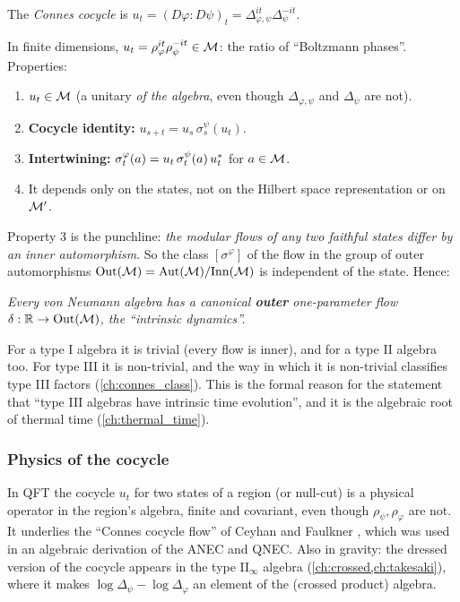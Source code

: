 \begin{definition}
The \emph{Connes cocycle} is $u_t=(D\varphi:D\psi)_t=\Delta_{\varphi,\psi}^{it}\Delta_\psi^{-it}$.
\end{definition}
In finite dimensions, $u_t=\rho_\varphi^{it}\rho_\psi^{-it}\in\mathcal{M}$: the ratio of ``Boltzmann phases''. Properties:
\begin{enumerate}
\item $u_t\in\mathcal{M}$ (a unitary \emph{of the algebra}, even though $\Delta_{\varphi,\psi}$ and $\Delta_\psi$ are not).
\item \textbf{Cocycle identity:} $u_{s+t}=u_s\,\sigma^\psi_s(u_t)$.
\item \textbf{Intertwining:} $\sigma^\varphi_t(a)=u_t\,\sigma^\psi_t(a)\,u_t^{*}$ for $a\in\mathcal{M}$.
\item It depends only on the states, not on the Hilbert space representation or on $\mathcal{M}'$.
\end{enumerate}
Property 3 is the punchline: \emph{the modular flows of any two faithful states differ by an inner automorphism}. So the class $[\sigma^\varphi]$ of the flow in the group of outer automorphisms $\mathrm{Out}(\mathcal{M})=\operatorname{Aut}(\mathcal{M})/\mathrm{Inn}(\mathcal{M})$ is independent of the state. Hence:

\begin{center}
\emph{Every von Neumann algebra has a canonical \textbf{outer} one-parameter flow $\delta:\mathbb{R}\to\mathrm{Out}(\mathcal{M})$, the ``intrinsic dynamics''.}
\end{center}
For a type I algebra it is trivial (every flow is inner), and for a type II algebra too. For type III it is non-trivial, and the way in which it is non-trivial classifies type III factors (\cref{ch:connes_class}). This is the formal reason for the statement that ``type III algebras have intrinsic time evolution'', and it is the algebraic root of thermal time (\cref{ch:thermal_time}).

\subsubsection*{Physics of the cocycle}
In QFT the cocycle $u_t$ for two states of a region (or null-cut) is a physical operator in the region's algebra, finite and covariant, even though $\rho_\psi,\rho_\varphi$ are not. It underlies the ``Connes cocycle flow'' of Ceyhan and Faulkner \cite{CeyhanFaulkner2020}, which was used in an algebraic derivation of the ANEC and QNEC. Also in gravity: the dressed version of the cocycle appears in the type II$_\infty$ algebra (\cref{ch:crossed,ch:takesaki}), where it makes $\log\Delta_\psi-\log\Delta_\varphi$ an element of the (crossed product) algebra.

